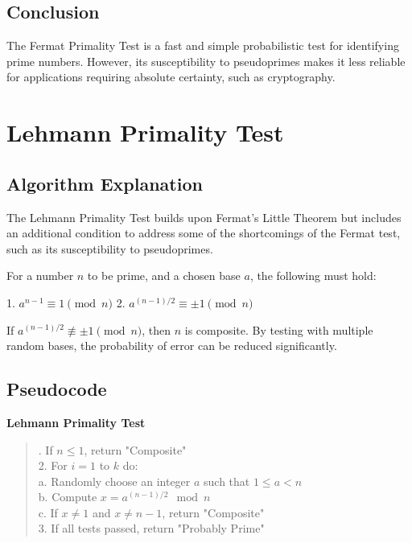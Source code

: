 \documentclass[12pt]{article}
\begin{document}
\subsection*{Conclusion}

The Fermat Primality Test is a fast and simple probabilistic test for identifying prime numbers. However, its susceptibility to pseudoprimes makes it less reliable for applications requiring absolute certainty, such as cryptography.



\section{Lehmann Primality Test}

\subsection*{Algorithm Explanation}

The Lehmann Primality Test builds upon Fermat's Little Theorem but includes an additional condition to address some of the shortcomings of the Fermat test, such as its susceptibility to pseudoprimes.

For a number \( n \) to be prime, and a chosen base \( a \), the following must hold:

1. \( a^{n-1} \equiv 1 \pmod{n} \)
2. \( a^{(n-1)/2} \equiv \pm1 \pmod{n} \)

If \( a^{(n-1)/2} \not\equiv \pm1 \pmod{n} \), then \( n \) is composite. By testing with multiple random bases, the probability of error can be reduced significantly.

\subsection*{Pseudocode}

\textbf{Lehmann Primality Test}


\begin{quote}. If \( n \leq 1 \), return "Composite" \\
2. For \( i = 1 \) to \( k \) do: \\
\hspace*{2em} a. Randomly choose an integer \( a \) such that \( 1 \leq a < n \) \\
\hspace*{2em} b. Compute \( x = a^{(n-1)/2} \mod n \) \\
\hspace*{2em} c. If \( x \neq 1 \) and \( x \neq n-1 \), return "Composite" \\
3. If all tests passed, return "Probably Prime"
\end{quote}
\end{document}
